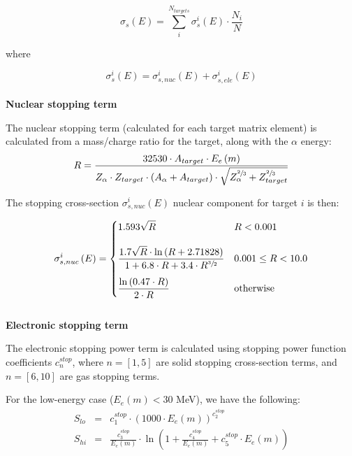 \documentclass[10pt]{article}
\begin{document}
\begin{equation}
\sigma_s\left(E\right) = \sum_{i}^{N_{targets}} \sigma_s^i\left(E\right) \cdot \frac{N_i}{N}
\end{equation}

where

\begin{equation}
\sigma_s^i\left(E\right) = \sigma_{s,nuc}^i\left(E\right) + \sigma_{s,ele}^i\left(E\right)
\end{equation}
\\

\textbf{Nuclear stopping term}

The nuclear stopping term (calculated for each target matrix element) is calculated from a mass/charge ratio for the target, along with the $\alpha$ energy:
\begin{equation}
\displaystyle R = \frac{32530 \cdot A_{target} \cdot E_e\left(m\right)}{Z_\alpha \cdot Z_{target} \cdot \left(A_\alpha + A_{target} \right) \cdot \sqrt{ Z_\alpha^{\sfrac{2}{3}} + Z_{target}^{\sfrac{2}{3}} } } 
\end{equation}

The stopping cross-section $\sigma_{s,nuc}^i \left(E\right)$ nuclear component for target $i$ is then:

\begin{equation}
\displaystyle \sigma_{s,nuc}^i\left(E\right) = 
\begin{cases}
\displaystyle 1.593 \sqrt{R} & R < 0.001 \\[12pt]
\displaystyle \frac{1.7 \sqrt{R} \cdot \ln \left(R + 2.71828\right)}{1 + 6.8 \cdot R + 3.4 \cdot R^{\sfrac{3}{2}}} & 0.001 \leq R < 10.0 \\[12pt]
\displaystyle \frac{\ln\left(0.47\cdot R\right)}{2\cdot R} & \mathrm{otherwise}
\end{cases}
\end{equation}
\\

\textbf{Electronic stopping term}

The electronic stopping power term is calculated using stopping power function coefficients $c_n^{stop}$, where $n=[1,5]$ are solid stopping cross-section terms, and $n=[6,10]$ are gas stopping terms.

For the low-energy case ($E_e\left(m\right) < 30$ MeV), we have the following:
\begin{eqnarray}
S_{lo} & = & c_1^{stop} \cdot \left(1000 \cdot E_e\left(m\right) \right)^{c_2^{stop}} \\
S_{hi} & = & \frac{c_3^{stop}}{E_e\left(m\right)} \cdot \ln \left( 1 + \frac{c_4^{stop}}{E_e\left(m\right)} + c_5^{stop}\cdot E_e\left(m\right) \right) 
\end{eqnarray}
\end{document}
